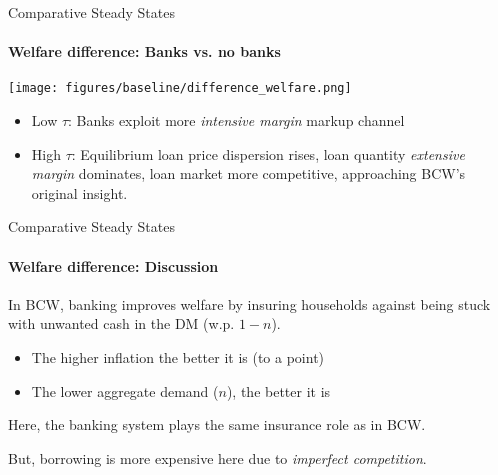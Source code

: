 \documentclass[10pt,english,slidetop,compress,
              blue,mathserif,color=option]{beamer}
\theoremstyle{plain}
\theoremstyle{definition}
\begin{document}



\begin{frame}{Comparative Steady States}
  \framesubtitle{Welfare difference: Banks vs. no banks}
  \begin{center}
    \texttt{[image: figures/baseline/difference\_welfare.png]}
        \begin{itemize}
          \item Low $\tau$: Banks exploit more \emph{intensive margin} markup channel
          \item High $\tau$: Equilibrium loan price dispersion rises, loan quantity \emph{extensive margin} dominates, loan market more competitive, approaching BCW's original insight.
        \end{itemize}
  \end{center}
\end{frame}

\begin{frame}{Comparative Steady States}
    \framesubtitle{Welfare difference: Discussion}
  In BCW, banking improves welfare by insuring households against being stuck with unwanted cash in the DM (w.p. $1-n$).  

  \begin{itemize}
    \item The higher inflation the better it is (to a point)
    \item The lower aggregate demand ($n$), the better it is
  \end{itemize}

  \bigskip

  Here, the banking system plays the same insurance role as in BCW.

  \bigskip

  But, borrowing is more expensive here due to \emph{imperfect competition}.

\end{frame}
\end{document}
